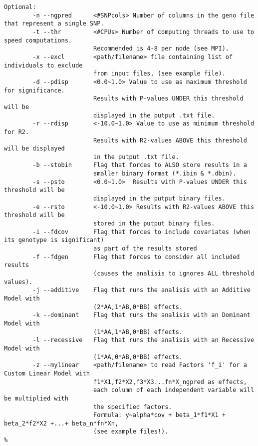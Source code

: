 \documentclass{report}
\begin{document}
\begin{lstlisting}[escapechar=\%]
Optional:
        -n --ngpred      <#SNPcols> Number of columns in the geno file that represent a single SNP.
        -t --thr         <#CPUs> Number of computing threads to use to speed computations.
                         Recommended is 4-8 per node (see MPI).
        -x --excl        <path/filename> file containing list of individuals to exclude
                         from input files, (see example file).
        -d --pdisp       <0.0~1.0> Value to use as maximum threshold for significance.
                         Results with P-values UNDER this threshold will be
                         displayed in the putput .txt file.
        -r --rdisp       <-10.0~1.0> Value to use as minimum threshold for R2.
                         Results with R2-values ABOVE this threshold will be displayed
                         in the putput .txt file.
        -b --stobin      Flag that forces to ALSO store results in a
                         smaller binary format (*.ibin & *.dbin).
        -s --psto        <0.0~1.0>  Results with P-values UNDER this threshold will be
                         displayed in the putput binary files.
        -e --rsto        <-10.0~1.0> Results with R2-values ABOVE this threshold will be
                         stored in the putput binary files.
        -i --fdcov       Flag that forces to include covariates (when its genotype is significant)
                         as part of the results stored
        -f --fdgen       Flag that forces to consider all included results
                         (causes the analisis to ignores ALL threshold values).
        -j --additive    Flag that runs the analisis with an Additive Model with
                         (2*AA,1*AB,0*BB) effects.
        -k --dominant    Flag that runs the analisis with an Dominant Model with
                         (1*AA,1*AB,0*BB) effects.
        -l --recessive   Flag that runs the analisis with an Recessive Model with
                         (1*AA,0*AB,0*BB) effects.
        -z --mylinear    <path/filename> to read Factors 'f_i' for a Custom Linear Model with
                         f1*X1,f2*X2,f3*X3...fn*X_ngpred as effects,
                         each column of each independent variable will be multiplied with
                         the specified factors.
                         Formula: y~alpha*cov + beta_1*f1*X1 + beta_2*f2*X2 +...+ beta_n*fn*Xn,
                         (see example files!).
%
\end{lstlisting}
\pagebreak
\end{document}
